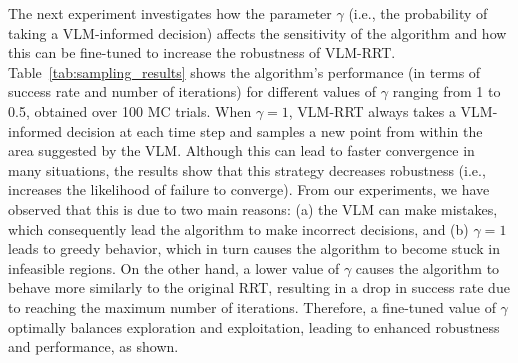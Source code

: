 \begin{table}
\centering
\caption{VLM-RRT robustness analysis}
\label{tab:sampling_results}
\end{table}

The next experiment investigates how the parameter \( \gamma \) (i.e., the probability of taking a VLM-informed decision) affects the sensitivity of the algorithm and how this can be fine-tuned to increase the robustness of VLM-RRT. Table~\ref{tab:sampling_results} shows the algorithm's performance (in terms of success rate and number of iterations) for different values of \( \gamma \) ranging from 1 to 0.5, obtained over 100 MC trials. When \( \gamma = 1 \), VLM-RRT always takes a VLM-informed decision at each time step and samples a new point from within the area suggested by the VLM. Although this can lead to faster convergence in many situations, the results show that this strategy decreases robustness (i.e., increases the likelihood of failure to converge). From our experiments, we have observed that this is due to two main reasons: (a) the VLM can make mistakes, which consequently lead the algorithm to make incorrect decisions, and (b) \( \gamma = 1 \) leads to greedy behavior, which in turn causes the algorithm to become stuck in infeasible regions. On the other hand, a lower value of \( \gamma \) causes the algorithm to behave more similarly to the original RRT, resulting in a drop in success rate due to reaching the maximum number of iterations. Therefore, a fine-tuned value of \( \gamma \) optimally balances exploration and exploitation, leading to enhanced robustness and performance, as shown.

